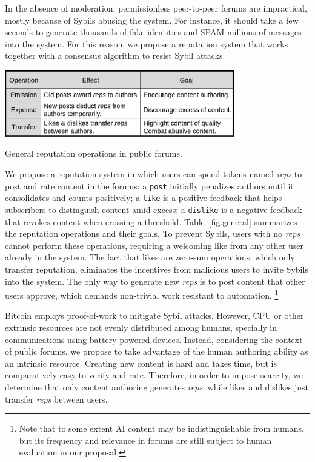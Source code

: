 \documentclass[12pt]{article}
\newcommand{\reps}     {\emph{reps}\xspace}
\newcommand{\code}[1]  {\texttt{\footnotesize{#1}}}
\begin{document}
In the absence of moderation, permissionless peer-to-peer forums are
impractical, mostly because of Sybils abusing the system.
For instance, it should take a few seconds to generate thousands of fake
identities and SPAM millions of messages into the system.
For this reason, we propose a reputation system that works together with a
consensus algorithm to resist Sybil attacks.

\begin{table}
\centering
\includegraphics[width=0.75\textwidth]{general.png}
\caption{General reputation operations in public forums.}
\label{fig.general}
\end{table}

We propose a reputation system in which users can spend tokens named \reps to
post and rate content in the forums:
a \code{post} initially penalizes authors until it consolidates and counts
positively;
a \code{like} is a positive feedback that helps subscribers to distinguish
content amid excess;
a \code{dislike} is a negative feedback that revokes content when crossing a
threshold.
Table~\ref{fig.general} summarizes the reputation operations and their goals.
To prevent Sybils, users with no \reps cannot perform these operations,
requiring a welcoming like from any other user already in the system.
The fact that likes are zero-sum operations, which only transfer reputation,
eliminates the incentives from malicious users to invite Sybils into the
system.
The only way to generate new \reps is to post content that other users approve,
which demands non-trivial work resistant to automation.%
\footnote{
    Note that to some extent AI content may be indistinguishable from humans,
    but its frequency and relevance in forums are still subject to human
    evaluation in our proposal.
}

Bitcoin employs proof-of-work to mitigate Sybil attacks.
However, CPU or other extrinsic resources are not evenly distributed among
humans, specially in communications using battery-powered devices.
%
Instead, considering the context of public forums, we propose to take advantage
of the human authoring ability as an intrinsic resource.
Creating new content is hard and takes time, but is comparatively easy to
verify and rate.
Therefore, in order to impose scarcity, we determine that only content
authoring generates \reps, while likes and dislikes just transfer \reps between
users.
\end{document}
